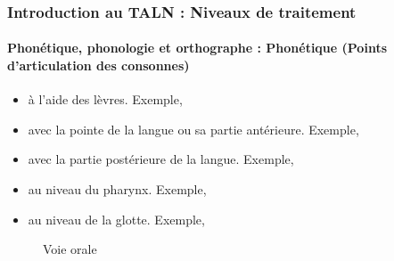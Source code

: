 \documentclass[xcolor=table]{beamer}
\begin{document}
\begin{frame}
\frametitle{Introduction au TALN : Niveaux de traitement}
\framesubtitle{Phonétique, phonologie et orthographe : Phonétique (Points d'articulation des consonnes)}

\begin{minipage}{0.5\textwidth}
\begin{itemize}
	\item {} à l'aide des lèvres. Exemple, \expword{\textipa{[b], [p], [m], [f], [v]}}
	\item {} avec la pointe de la langue ou sa partie antérieure. 
	Exemple, 
	\item {} avec la partie postérieure de la langue. Exemple, 
	\item {} au niveau du pharynx. 
	Exemple, 
	\item {} au niveau de la glotte. 
	Exemple, 
\end{itemize}
\end{minipage}
\begin{minipage}{0.48\textwidth}
	\begin{figure}
		\caption{Voie orale \cite{2009-ball}}
	\end{figure}
\end{minipage}

\end{frame}
\end{document}
